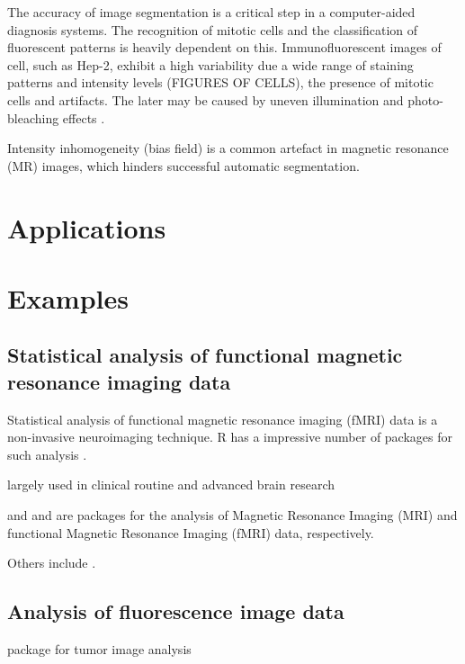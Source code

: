The accuracy of image segmentation is a critical step in a computer-aided 
diagnosis systems. The recognition of mitotic cells and the classification of 
fluorescent patterns is heavily dependent on this. Immunofluorescent images 
of cell, such as Hep-2, exhibit a high variability due a wide range of staining 
patterns and intensity levels (FIGURES OF CELLS), the presence of mitotic 
cells and  artifacts. The later may be caused by uneven illumination and 
photo-bleaching effects \citep{tonti_automated_2015}.

Intensity inhomogeneity (bias field) is a common artefact in magnetic resonance 
(MR) images, which hinders successful automatic segmentation. \citep{ivanovska_efficient_2016}

\section{Applications}

\section{Examples}
\subsection{Statistical analysis of functional magnetic resonance imaging data}

Statistical analysis of functional magnetic resonance imaging (fMRI) data  is a 
non-invasive neuroimaging technique. R has a impressive number of packages for 
such analysis \citep{tabelow_special_2011}.

largely used in clinical routine and advanced brain research

 \citep{bordier_temporal_2011, marchini_analyzefmri:_2002} and  
\citep{polzehl_fmri:_2007} and are packages for the analysis of Magnetic 
Resonance Imaging (MRI) and functional Magnetic Resonance Imaging (fMRI) data, 
respectively.

 \citep{philipsen_pet:_2010}

Others include  \citep{dunning_beadarray:_2006, frery_introduction_2013}.

\subsection{Analysis of fluorescence image data}

 package \citep{failmezger_crimage:_2012} for tumor image analysis


